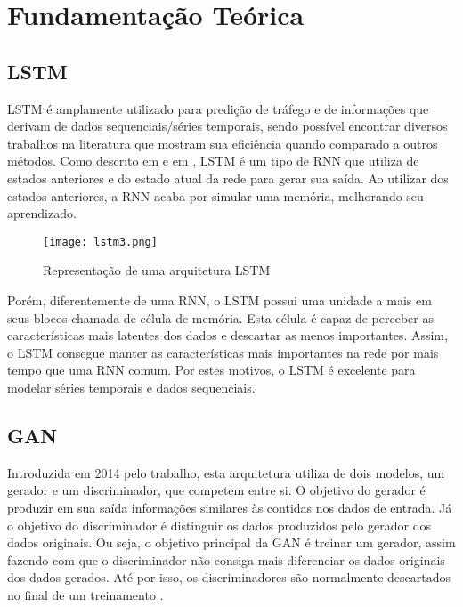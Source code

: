 
\section{Fundamentação Teórica}

\subsection {LSTM}

\acrfull{LSTM} é amplamente utilizado para predição de tráfego e de informações que derivam de dados sequenciais/séries temporais, sendo possível encontrar diversos trabalhos na literatura que mostram sua eficiência quando comparado a outros métodos. Como descrito em \cite{Zainab_2018} e em \cite{Xiaolei_2015}, \acrshort{LSTM} é um tipo de \acrfull{RNN} que utiliza de estados anteriores e do estado atual da rede para gerar sua saída. Ao utilizar dos estados anteriores, a \acrshort{RNN} acaba por simular uma memória, melhorando seu aprendizado. 

\begin{figure}[htb]
    \centering
    \texttt{[image: lstm3.png]}
    \label{figure:eixo}
    \caption[Representação de uma arquitetura LSTM]{Representação de uma arquitetura LSTM\footnotemark}
\end{figure}


Porém, diferentemente de uma \acrshort{RNN}, o LSTM possui uma unidade a mais em seus blocos chamada de célula de memória. Esta célula é capaz de perceber as características mais latentes dos dados e descartar as menos importantes. Assim, o \acrshort{LSTM} consegue manter as características mais importantes na rede por mais tempo que uma \acrfull{RNN} comum. Por estes motivos, o \acrshort{LSTM} é excelente para modelar séries temporais e dados sequenciais.

\subsection {GAN}

Introduzida em 2014 pelo trabalho\cite{NIPS2014_5423}, esta arquitetura utiliza de dois modelos, um gerador e um discriminador, que competem entre si. O objetivo do gerador é produzir em sua saída informações similares às contidas nos dados de entrada. Já o objetivo do discriminador é distinguir os dados produzidos pelo gerador dos dados originais. Ou seja, o objetivo principal da \acrshort{GAN} é treinar um gerador, assim fazendo com que o discriminador não consiga mais diferenciar os dados originais dos dados gerados. Até por isso, os discriminadores são normalmente descartados no final de um treinamento \cite{turner2018metropolis}.

